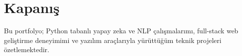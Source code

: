 \vfill

\section*{Kapanış}

Bu portfolyo; Python tabanlı yapay zeka ve NLP çalışmalarımı, full-stack web geliştirme deneyimimi ve yazılım araçlarıyla yürüttüğüm teknik projeleri özetlemektedir.
